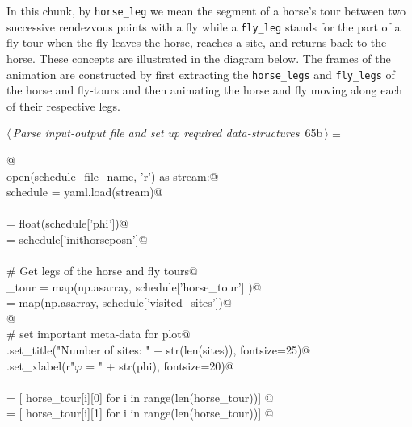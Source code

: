 \documentclass[11.5pt]{report}
\begin{document}
\vspace{-0.8cm} \newchunk In this chunk, by \verb|horse_leg| we mean the segment of a horse's 
tour between two successive rendezvous points with a fly while a \verb|fly_leg| stands for 
the part of a fly tour when the fly leaves the horse, reaches a site, and returns back to the horse. These
concepts are illustrated in the diagram below. The frames of the animation are constructed by first
extracting the \verb|horse_legs| and \verb|fly_legs| of the horse and fly-tours and then 
animating the horse and fly moving along each of their respective legs. 


\begin{flushleft} \small\label{scrap94}\raggedright\small
{} $\langle\,${\itshape Parse input-output file and set up required data-structures}\nobreak\ {\footnotesize {65b}}$\,\rangle\equiv$
\vspace{-1ex}
\begin{list}{}{} \item
\mbox{}\verb@   @\\
\mbox{}\verb@with open(schedule_file_name, 'r') as stream:@\\
\mbox{}\verb@      schedule = yaml.load(stream)@\\
\mbox{}\verb@@\\
\mbox{}\verb@phi           = float(schedule['phi'])@\\
\mbox{}\verb@inithorseposn = schedule['inithorseposn']@\\
\mbox{}\verb@@\\
\mbox{}\verb@# Get legs of the horse and fly tours@\\
\mbox{}\verb@horse_tour  = map(np.asarray, schedule['horse_tour']   )@\\
\mbox{}\verb@sites       = map(np.asarray, schedule['visited_sites'])@\\
\mbox{}\verb@           @\\
\mbox{}\verb@# set important meta-data for plot@\\
\mbox{}\verb@ax.set_title("Number of sites: " + str(len(sites)), fontsize=25)@\\
\mbox{}\verb@ax.set_xlabel(r"$\varphi$ = " + str(phi), fontsize=20)@\\
\mbox{}\verb@@\\
\mbox{}\verb@xhs = [ horse_tour[i][0] for i in range(len(horse_tour))]    @\\
\mbox{}\verb@yhs = [ horse_tour[i][1] for i in range(len(horse_tour))]    @\\

\end{list}
\end{flushleft}
\end{document}
